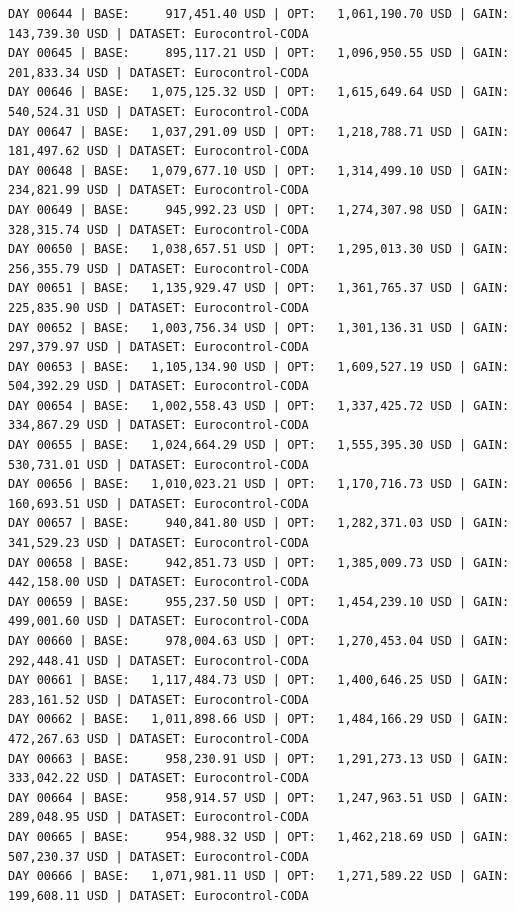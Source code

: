 \documentclass[11pt,a4paper]{article}
\begin{document}
\begin{verbatim}
DAY 00644 | BASE:     917,451.40 USD | OPT:   1,061,190.70 USD | GAIN: 143,739.30 USD | DATASET: Eurocontrol-CODA
DAY 00645 | BASE:     895,117.21 USD | OPT:   1,096,950.55 USD | GAIN: 201,833.34 USD | DATASET: Eurocontrol-CODA
DAY 00646 | BASE:   1,075,125.32 USD | OPT:   1,615,649.64 USD | GAIN: 540,524.31 USD | DATASET: Eurocontrol-CODA
DAY 00647 | BASE:   1,037,291.09 USD | OPT:   1,218,788.71 USD | GAIN: 181,497.62 USD | DATASET: Eurocontrol-CODA
DAY 00648 | BASE:   1,079,677.10 USD | OPT:   1,314,499.10 USD | GAIN: 234,821.99 USD | DATASET: Eurocontrol-CODA
DAY 00649 | BASE:     945,992.23 USD | OPT:   1,274,307.98 USD | GAIN: 328,315.74 USD | DATASET: Eurocontrol-CODA
DAY 00650 | BASE:   1,038,657.51 USD | OPT:   1,295,013.30 USD | GAIN: 256,355.79 USD | DATASET: Eurocontrol-CODA
DAY 00651 | BASE:   1,135,929.47 USD | OPT:   1,361,765.37 USD | GAIN: 225,835.90 USD | DATASET: Eurocontrol-CODA
DAY 00652 | BASE:   1,003,756.34 USD | OPT:   1,301,136.31 USD | GAIN: 297,379.97 USD | DATASET: Eurocontrol-CODA
DAY 00653 | BASE:   1,105,134.90 USD | OPT:   1,609,527.19 USD | GAIN: 504,392.29 USD | DATASET: Eurocontrol-CODA
DAY 00654 | BASE:   1,002,558.43 USD | OPT:   1,337,425.72 USD | GAIN: 334,867.29 USD | DATASET: Eurocontrol-CODA
DAY 00655 | BASE:   1,024,664.29 USD | OPT:   1,555,395.30 USD | GAIN: 530,731.01 USD | DATASET: Eurocontrol-CODA
DAY 00656 | BASE:   1,010,023.21 USD | OPT:   1,170,716.73 USD | GAIN: 160,693.51 USD | DATASET: Eurocontrol-CODA
DAY 00657 | BASE:     940,841.80 USD | OPT:   1,282,371.03 USD | GAIN: 341,529.23 USD | DATASET: Eurocontrol-CODA
DAY 00658 | BASE:     942,851.73 USD | OPT:   1,385,009.73 USD | GAIN: 442,158.00 USD | DATASET: Eurocontrol-CODA
DAY 00659 | BASE:     955,237.50 USD | OPT:   1,454,239.10 USD | GAIN: 499,001.60 USD | DATASET: Eurocontrol-CODA
DAY 00660 | BASE:     978,004.63 USD | OPT:   1,270,453.04 USD | GAIN: 292,448.41 USD | DATASET: Eurocontrol-CODA
DAY 00661 | BASE:   1,117,484.73 USD | OPT:   1,400,646.25 USD | GAIN: 283,161.52 USD | DATASET: Eurocontrol-CODA
DAY 00662 | BASE:   1,011,898.66 USD | OPT:   1,484,166.29 USD | GAIN: 472,267.63 USD | DATASET: Eurocontrol-CODA
DAY 00663 | BASE:     958,230.91 USD | OPT:   1,291,273.13 USD | GAIN: 333,042.22 USD | DATASET: Eurocontrol-CODA
DAY 00664 | BASE:     958,914.57 USD | OPT:   1,247,963.51 USD | GAIN: 289,048.95 USD | DATASET: Eurocontrol-CODA
DAY 00665 | BASE:     954,988.32 USD | OPT:   1,462,218.69 USD | GAIN: 507,230.37 USD | DATASET: Eurocontrol-CODA
DAY 00666 | BASE:   1,071,981.11 USD | OPT:   1,271,589.22 USD | GAIN: 199,608.11 USD | DATASET: Eurocontrol-CODA

\end{verbatim}
\end{document}
